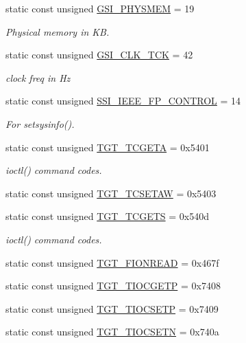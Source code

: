 \begin{Indent}{\bf }
\begin{DoxyCompactItemize}
static const unsigned \hyperlink{classMipsLinux_a2c859016d59653914527bcd85a154da4}{GSI\_\-PHYSMEM} = 19
\begin{DoxyCompactList}\small\item\em Physical memory in KB. \item\end{DoxyCompactList}\item 
static const unsigned \hyperlink{classMipsLinux_a26c255cf18ca324c7c09a629e9e2a4f0}{GSI\_\-CLK\_\-TCK} = 42
\begin{DoxyCompactList}\small\item\em clock freq in Hz \item\end{DoxyCompactList}\item 
static const unsigned \hyperlink{classMipsLinux_a4dea1885b08c38c78286ecd5ffd5488d}{SSI\_\-IEEE\_\-FP\_\-CONTROL} = 14
\begin{DoxyCompactList}\small\item\em For setsysinfo(). \item\end{DoxyCompactList}\item 
static const unsigned \hyperlink{classMipsLinux_a804fc265279c5dbd78e0f95da998b267}{TGT\_\-TCGETA} = 0x5401
\begin{DoxyCompactList}\small\item\em ioctl() command codes. \item\end{DoxyCompactList}\item 
static const unsigned \hyperlink{classMipsLinux_a96e06e042526ea5e89c4e8a020636c52}{TGT\_\-TCSETAW} = 0x5403
\item 
static const unsigned \hyperlink{classMipsLinux_a50e5d880569ec2cb9a2f3d4aaa55cc64}{TGT\_\-TCGETS} = 0x540d
\begin{DoxyCompactList}\small\item\em ioctl() command codes. \item\end{DoxyCompactList}\item 
static const unsigned \hyperlink{classMipsLinux_a1def346ff527c8efccfd52463f3b5dc1}{TGT\_\-FIONREAD} = 0x467f
\item 
static const unsigned \hyperlink{classMipsLinux_a90fcc56bd4aa74a5d86c87bfeae77625}{TGT\_\-TIOCGETP} = 0x7408
\item 
static const unsigned \hyperlink{classMipsLinux_a194059e48b091a80833c40b500e70bec}{TGT\_\-TIOCSETP} = 0x7409
\item 
static const unsigned \hyperlink{classMipsLinux_a6783bea53088dc89157c39a9a7c71988}{TGT\_\-TIOCSETN} = 0x740a
\end{DoxyCompactItemize}
\end{Indent}



